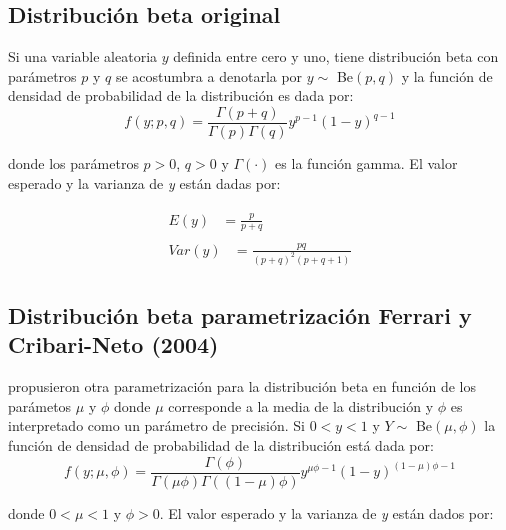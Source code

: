 \subsection{Distribuci\'{o}n beta original}

Si una variable aleatoria $y$ definida entre cero y uno, tiene distribuci\'{o}n beta con par\'{a}metros $p$ y $q$ se acostumbra a denotarla por $y \sim$ Be$(p,q)$ y la funci\'{o}n de densidad de probabilidad de la distribuci\'{o}n es dada por:
\begin{equation}
f(y;p,q)=\frac{\Gamma(p+q)}{\Gamma(p)\Gamma(q)}y^{p-1}(1-y)^{q-1}
\end{equation}

donde los par\'{a}metros $p>0$, $q>0$ y $\Gamma(\cdot)$ es la funci\'{o}n gamma. El valor esperado y la varianza de \textit{y} est\'{a}n dadas por:

\begin{align}
\begin{split}
	E(y) &= \frac{p}{p+q} 
\end{split} \label{E_Origin} \\
\begin{split}
	Var(y) &= \frac{pq}{(p+q)^2(p+q+1)}
\end{split} \label{V_Origin}
\end{align}


\subsection{Distribuci\'{o}n beta parametrizaci\'{o}n Ferrari y Cribari-Neto (2004)}


\cite{Ferrari2} propusieron otra parametrizaci\'{o}n para la distribuci\'{o}n beta en funci\'{o}n de los par\'{a}metos $\mu$ y $\phi$ donde $\mu$ corresponde a la media de la distribuci\'{o}n y $\phi$ es interpretado como un par\'{a}metro de precisi\'{o}n. Si $0<y<1$ y $Y \sim$ Be$(\mu,\phi)$ la funci\'{o}n de densidad de probabilidad de la distribuci\'{o}n est\'{a} dada por:
\begin{equation}
f(y;\mu,\phi)=\frac{\Gamma(\phi)}{\Gamma(\mu\phi)\Gamma((1-\mu)\phi)}y^{\mu\phi-1}(1-y)^{(1-\mu)\phi-1}
\end{equation}

donde $0<\mu<1$ y $\phi>0$. El valor esperado y la varianza de \textit{y} est\'{a}n dados por:


